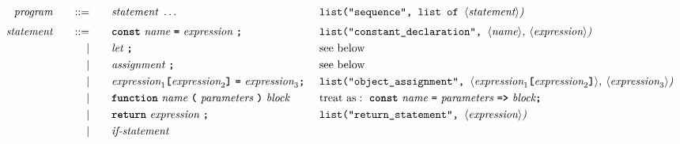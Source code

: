 \begin{alignat*}{9}
&& \textit{program}    &&\quad ::= &\quad && \textit{statement} \ \ldots
                                                           && \texttt{list("sequence", list of  } \langle \textit{statement}\rangle \textit{)} \\[1mm]
&& \textit{statement}    &&\quad ::= &\quad && \textbf{\texttt{const}}\  \textit{name} \ 
                                           \textbf{\texttt{=}}\  \textit{expression} \ \textbf{\texttt{;}}
                                                           && \texttt{list("constant\_declaration",  } \langle \textit{name}\rangle \textit{,  } \langle \textit{expression}\rangle \textit{)} \\
&&                       && |   &\quad && \textit{let} \ \textbf{\texttt{;}}
                                                           &&  \textrm{see below}\\
&&                       && |   &\quad && \textit{assignment} \ \textbf{\texttt{;}}
                                                           && \textrm{see below}\\
&&                       && |   &\quad && \textit{expression}_1 \textbf{\texttt{[}}
                                          \textit{expression}_2 \textbf{\texttt{]}} \ 
                                           \textbf{\texttt{=}}\  \textit{expression}_3  \textbf{\texttt{;}}\ 
                                                           && \texttt{list("object\_assignment", } \langle \textit{expression}_1 \textbf{\texttt{[}} \textit{expression}_2 \textbf{\texttt{]}}  \rangle \textit{,  } \langle \textit{expression}_3\rangle \textit{)} \\
&&                       && |   &\quad && \textbf{\texttt{function}}\  \textit{name} \ 
                                   \textbf{\texttt{(}}\  \textit{parameters} \ \textbf{\texttt{)}}\ \textit{block} \quad
                                                           &&  \textrm{treat as}:\ \textbf{\texttt{const}}\  \textit{name} \ 
                                   \textbf{\texttt{=}}\  \textit{parameters} \ \textbf{\texttt{=>}}\ \textit{block} \textbf{\texttt{;}} \\
&&                       && |   &\quad && \textbf{\texttt{return}}\  \textit{expression} \ \textbf{\texttt{;}}
                                                           && \texttt{list("return\_statement",  } \langle \textit{expression}\rangle \textit{)} \\
&&                       && |   &\quad && \textit{if-statement} \quad

\end{alignat*}
